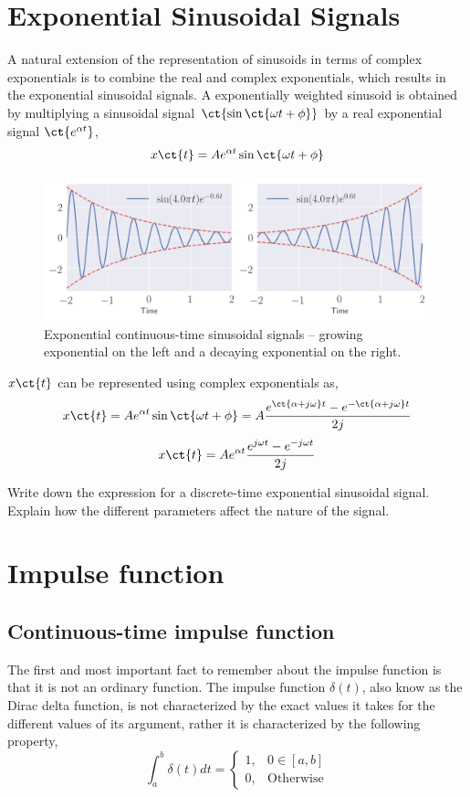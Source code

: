 \section{Exponential Sinusoidal Signals}
A natural extension of the representation of sinusoids in terms of complex exponentials is to combine the real and complex exponentials, which results in the exponential sinusoidal signals. A exponentially weighted sinusoid is obtained by multiplying a sinusoidal signal $\ct{\sin\ct{\omega t + \phi}}$ by a real exponential signal $\ct{e^{\alpha t}}$,
\[ x\ct{t} = Ae^{\alpha t}\sin\ct{\omega t + \phi} \]

\begin{figure}[h]
    \centering
    \includegraphics[width=\columnwidth]{figs/ch2-expsine.png}
    \caption{Exponential continuous-time sinusoidal signals -- growing exponential on the left and a decaying exponential on the right.} \label{fig:ch2-expsine}
\end{figure}

\noindent $x\ct{t}$ can be represented using complex exponentials as,
\[ x\ct{t} = Ae^{\alpha t}\sin\ct{\omega t + \phi} = A\frac{e^{\ct{\alpha + j\omega}t} - e^{-\ct{\alpha + j\omega}t}}{2j} \]
\[ x\ct{t} = Ae^{\alpha t}\frac{e^{j\omega t} - e^{-j\omega t}}{2j} \]

\begin{problem*}[frametitle=Discrete-time exponential sinusoidal signals]
    Write down the expression for a discrete-time exponential sinusoidal signal. Explain how the different parameters affect the nature of the signal.
\end{problem*}

\section{Impulse function}
\subsection{Continuous-time impulse function}
The first and most important fact to remember about the impulse function is that it is not an ordinary function. The impulse function $\delta\left(t\right)$, also know as the Dirac delta function, is not characterized by the exact values it takes for the different values of its argument, rather it is characterized by the following property,
\[ \int_{a}^{b}\delta\left(t\right)dt = 
\begin{cases}
    1, & 0 \in \left[a, b\right] \\
    0, & \mathrm{Otherwise}
\end{cases}
\]

